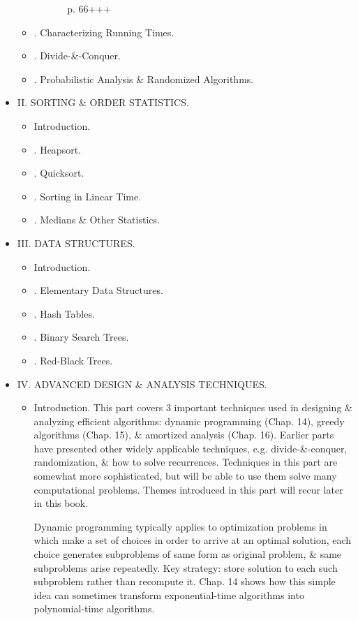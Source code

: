 \documentclass{article}
\begin{document}
\begin{itemize}
\begin{itemize}
\begin{itemize}
\begin{itemize}
                p. 66+++
            \end{itemize}
        \end{itemize}
		\item {. Characterizing Running Times.}
		\item {. Divide-\&-Conquer.}
		\item {. Probabilistic Analysis \& Randomized Algorithms.}
	\end{itemize}
	\item {\sf II. SORTING \& ORDER STATISTICS.}
	\begin{itemize}
		\item {\sf Introduction.}
		\item {. Heapsort.}
		\item {. Quicksort.}
		\item {. Sorting in Linear Time.}
		\item {. Medians \& Other Statistics.}
	\end{itemize}
	\item {\sf III. DATA STRUCTURES.}
	\begin{itemize}
		\item {\sf Introduction.}
		\item {. Elementary Data Structures.}
		\item {. Hash Tables.}
		\item {. Binary Search Trees.}
		\item {. Red-Black Trees.}
	\end{itemize}
	\item {\sf IV. ADVANCED DESIGN \& ANALYSIS TECHNIQUES.}
	\begin{itemize}
		\item {\sf Introduction.} This part covers 3 important techniques used in designing \& analyzing efficient algorithms: dynamic programming (Chap. 14), greedy algorithms (Chap. 15), \& amortized analysis (Chap. 16). Earlier parts have presented other widely applicable techniques, e.g. divide-\&-conquer, randomization, \& how to solve recurrences. Techniques in this part are somewhat more sophisticated, but will be able to use them solve many computational problems. Themes introduced in this part will recur later in this book.
		
		Dynamic programming typically applies to optimization problems in which make a set of choices in order to arrive at an optimal solution, each choice generates subproblems of same form as original problem, \& same subproblems arise repeatedly. Key strategy: store solution to each such subproblem rather than recompute it. Chap. 14 shows how this simple idea can sometimes transform exponential-time algorithms into polynomial-time algorithms.
		

\end{itemize}
\end{itemize}
\end{document}
